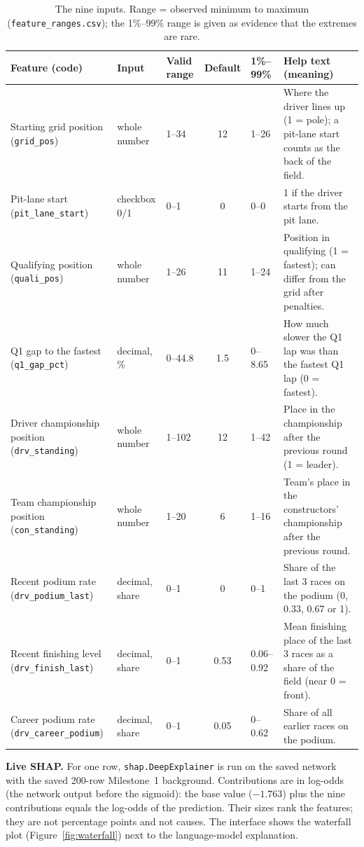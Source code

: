 \documentclass[10pt,a4paper]{article}
\newcommand{\code}[1]{\texttt{#1}}
\begin{document}
\begin{table}[H]
\centering\scriptsize
\caption{The nine inputs. Range = observed minimum to maximum (\code{feature\_ranges.csv}); the 1\%--99\% range is given as evidence that the extremes are rare.}\label{tab:features}
\begin{tabular}{@{}R{2.9cm}R{1.5cm}R{1.5cm}cR{1.7cm}R{6.0cm}@{}}
\toprule
Feature (code) & Input & Valid range & Default & 1\%--99\% & Help text (meaning) \\
\midrule
Starting grid position (\code{grid\_pos}) & whole number & 1--34 & 12 & 1--26 & Where the driver lines up (1 = pole); a pit-lane start counts as the back of the field. \\
Pit-lane start (\code{pit\_lane\_start}) & checkbox 0/1 & 0--1 & 0 & 0--0 & 1 if the driver starts from the pit lane. \\
Qualifying position (\code{quali\_pos}) & whole number & 1--26 & 11 & 1--24 & Position in qualifying (1 = fastest); can differ from the grid after penalties. \\
Q1 gap to the fastest (\code{q1\_gap\_pct}) & decimal, \% & 0--44.8 & 1.5 & 0--8.65 & How much slower the Q1 lap was than the fastest Q1 lap (0 = fastest). \\
Driver championship position (\code{drv\_standing}) & whole number & 1--102 & 12 & 1--42 & Place in the championship after the previous round (1 = leader). \\
Team championship position (\code{con\_standing}) & whole number & 1--20 & 6 & 1--16 & Team's place in the constructors' championship after the previous round. \\
Recent podium rate (\code{drv\_podium\_last}) & decimal, share & 0--1 & 0 & 0--1 & Share of the last 3 races on the podium (0, 0.33, 0.67 or 1). \\
Recent finishing level (\code{drv\_finish\_last}) & decimal, share & 0--1 & 0.53 & 0.06--0.92 & Mean finishing place of the last 3 races as a share of the field (near 0 = front). \\
Career podium rate (\code{drv\_career\_podium}) & decimal, share & 0--1 & 0.05 & 0--0.62 & Share of all earlier races on the podium. \\
\bottomrule
\end{tabular}
\end{table}

\textbf{Live SHAP.} For one row, \code{shap.DeepExplainer} is run on the saved network with the saved 200-row Milestone~1 background. Contributions are in log-odds (the network output before the sigmoid): the base value ($-1.763$) plus the nine contributions equals the log-odds of the prediction. Their sizes rank the features; they are not percentage points and not causes. The interface shows the waterfall plot (Figure~\ref{fig:waterfall}) next to the language-model explanation.
\end{document}
